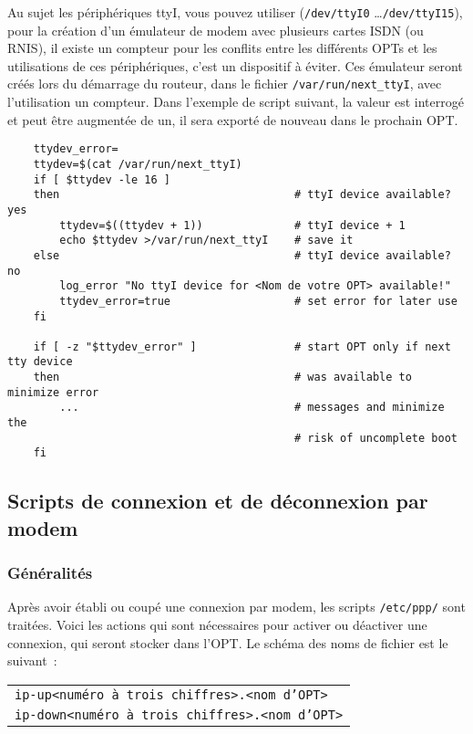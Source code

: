 Au sujet les périphériques ttyI, vous pouvez utiliser (\texttt{/dev/ttyI0} \ldots \texttt{/dev/ttyI15}),
pour la création d’un \og{}émulateur de modem\fg{} avec plusieurs cartes ISDN (ou RNIS),
il existe un compteur pour les conflits entre les différents OPTs et les utilisations
de ces périphériques, c'est un dispositif à éviter. Ces émulateur seront créés lors
du démarrage du routeur, dans le fichier \texttt{/var/run/next\_ttyI}, avec l'utilisation
un compteur. Dans l'exemple de script suivant, la valeur est interrogé et peut être augmentée
de un, il sera exporté de nouveau dans le prochain OPT.

\begin{example}
\begin{verbatim}
    ttydev_error=
    ttydev=$(cat /var/run/next_ttyI)
    if [ $ttydev -le 16 ]
    then                                    # ttyI device available? yes
        ttydev=$((ttydev + 1))              # ttyI device + 1
        echo $ttydev >/var/run/next_ttyI    # save it
    else                                    # ttyI device available? no
        log_error "No ttyI device for <Nom de votre OPT> available!"
        ttydev_error=true                   # set error for later use
    fi

    if [ -z "$ttydev_error" ]               # start OPT only if next tty device
    then                                    # was available to minimize error
        ...                                 # messages and minimize the
                                            # risk of uncomplete boot
    fi
\end{verbatim}
\end{example}

\subsection{Scripts de connexion et de déconnexion par modem}


\subsubsection{Généralités}

Après avoir établi ou coupé une connexion par modem, les scripts \texttt{/etc/ppp/} sont
traitées. Voici les actions qui sont nécessaires pour activer ou déactiver une connexion,
qui seront stocker dans l'OPT. Le schéma des noms de fichier est le suivant~:

\begin{table}[htbp]
\centering
\begin{tabular}{l}
    \texttt{ip-up<numéro à trois chiffres>.<nom d'OPT>}\\
    \texttt{ip-down<numéro à trois chiffres>.<nom d'OPT>}\\
\end{tabular}
\end{table}

